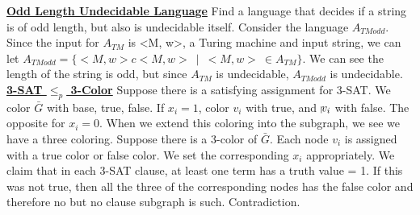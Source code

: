 \documentclass[10pt]{article}
\begin{document}
\begin{multicols*}{3}
\underline{\textbf{Odd Length Undecidable Language}} \newline
Find a language that decides if a string is of odd length, but also is undecidable itself. Consider the language $A_{TModd}$. Since the input for $A_{TM}$ is <M, w>, a Turing machine and input string, we can let $A_{TModd} = \{<M, w>c<M, w>\ \mid\ <M, w>\ \in A_{TM}\}$. We can see the length of the string is odd, but since $A_{TM}$ is undecidable, $A_{TModd}$ is undecidable. \newline \\
\underline{\textbf{3-SAT $\leq_p$ 3-Color}} \newline
Suppose there is a satisfying assignment for 3-SAT. We color $\bar{G}$ with base, true, false. If $x_i = 1$, color $v_i$ with true, and $\vline{v_i}$ with false. The opposite for $x_i = 0$. When we extend this coloring into the subgraph, we see we have a three coloring. \newline 
Suppose there is a 3-color of $\bar{G}$. Each node $v_i$ is assigned with a true color or false color. We set the corresponding $x_i$ appropriately. We claim that in each 3-SAT clause, at least one term has a truth value = 1. If this was not true, then all the three of the corresponding nodes has the false color and therefore no but no clause subgraph is such. Contradiction.
\end{multicols*}
\end{document}
